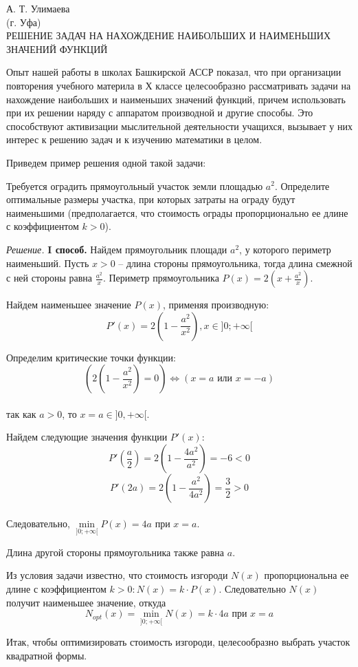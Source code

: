 \documentclass{article}
\begin{document}
\pagestyle{fancy}
А. Т. Улимаева
\\(г. Уфа)
\\РЕШЕНИЕ ЗАДАЧ НА НАХОЖДЕНИЕ НАИБОЛЬШИХ И НАИМЕНЬШИХ ЗНАЧЕНИЙ ФУНКЦИЙ
\par Опыт нашей работы в школах Башкирской АССР показал, что при организации повторения учебного материла в Х классе целесообразно рассматривать задачи на нахождение наибольших и наименьших значений функций, причем использовать при их решении наряду с аппаратом производной и другие способы. Это способствуют активизации мыслительной деятельности учащихся, вызывает у них интерес к решению задач и к изучению математики в целом.
\par Приведем пример решения одной такой задачи:
\par Требуется оградить прямоугольный участок земли площадью $a^2$. Определите оптимальные размеры участка, при которых затраты на ограду будут наименьшими (предполагается, что стоимость ограды пропорционально ее длине с коэффициентом $k>0$).
\par\textit{Решение.} \textbf{I способ.} Найдем прямоугольник площади $a^2$, у которого периметр наименьший. Пусть $x>0$ -- длина стороны прямоугольника, тогда длина смежной с ней стороны равна $\frac{a^2}{x}$. Периметр прямоугольника $P(x)=2(x+\frac{a^2}{x})$.
\par Найдем наименьшее значение $P(x)$, применяя производную:
$$P'(x)=2(1-\frac{a^2}{x^2}), x\in]0;+\infty[$$
\par Определим критические точки функции:
$$(2(1-\frac{a^2}{x^2})=0)\Leftrightarrow(x=a\mbox{ или }x=-a)$$
\\так как $a>0$, то $x=a\in]0,+\infty[$.
\par Найдем следующие значения функции $P'(x)$:
$$P'(\frac{a}{2})=2(1-\frac{4a^2}{a^2})=-6<0$$
$$P'(2a)=2(1-\frac{a^2}{4a^2})=\frac{3}{2}>0$$
\\Следовательно, $\min\limits_{]0;+\infty[}P(x)=4a$ при $x=a$.
\par Длина другой стороны прямоугольника также равна $a$.
\par Из условия задачи известно, что стоимость изгороди $N(x)$ пропорциональна ее длине с коэффициентом $k>0:N(x)=k\cdot P(x)$. Следовательно $N(x)$ получит наименьшее значение, откуда 
$$N_{opt}(x)=\min\limits_{]0;+\infty[}N(x)=k\cdot4a\mbox{ при }x=a$$
\par Итак, чтобы оптимизировать стоимость изгороди, целесообразно выбрать участок квадратной формы.
\end{document}
